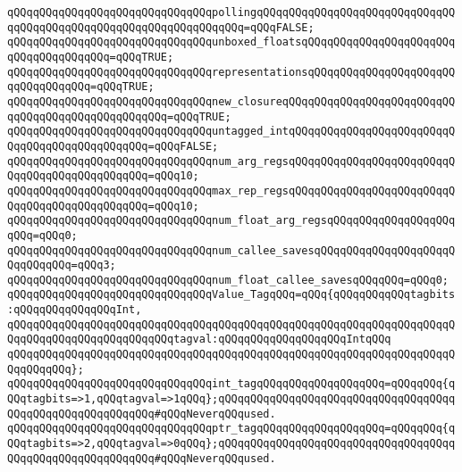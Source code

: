 \verb|qQQqqQQqqQQqqQQqqQQqqQQqqQQqqQQqpollingqQQqqQQqqQQqqQQqqQQqqQQqqQQqqQQqqQQqqQQqqQQqqQQqqQQqqQQqqQQqqQQqqQQq=qQQqFALSE;|\newline
\verb|qQQqqQQqqQQqqQQqqQQqqQQqqQQqqQQqunboxed_floatsqQQqqQQqqQQqqQQqqQQqqQQqqQQqqQQqqQQqqQQq=qQQqTRUE;|\newline
\verb|qQQqqQQqqQQqqQQqqQQqqQQqqQQqqQQqrepresentationsqQQqqQQqqQQqqQQqqQQqqQQqqQQqqQQqqQQq=qQQqTRUE;|\newline
\verb|qQQqqQQqqQQqqQQqqQQqqQQqqQQqqQQqnew_closureqQQqqQQqqQQqqQQqqQQqqQQqqQQqqQQqqQQqqQQqqQQqqQQqqQQq=qQQqTRUE;|\newline
\verb|qQQqqQQqqQQqqQQqqQQqqQQqqQQqqQQquntagged_intqQQqqQQqqQQqqQQqqQQqqQQqqQQqqQQqqQQqqQQqqQQqqQQq=qQQqFALSE;|\newline
\newline
\verb|qQQqqQQqqQQqqQQqqQQqqQQqqQQqqQQqnum_arg_regsqQQqqQQqqQQqqQQqqQQqqQQqqQQqqQQqqQQqqQQqqQQqqQQq=qQQq10;|\newline
\verb|qQQqqQQqqQQqqQQqqQQqqQQqqQQqqQQqmax_rep_regsqQQqqQQqqQQqqQQqqQQqqQQqqQQqqQQqqQQqqQQqqQQqqQQq=qQQq10;|\newline
\verb|qQQqqQQqqQQqqQQqqQQqqQQqqQQqqQQqnum_float_arg_regsqQQqqQQqqQQqqQQqqQQqqQQq=qQQq0;|\newline
\verb|qQQqqQQqqQQqqQQqqQQqqQQqqQQqqQQqnum_callee_savesqQQqqQQqqQQqqQQqqQQqqQQqqQQqqQQq=qQQq3;|\newline
\verb|qQQqqQQqqQQqqQQqqQQqqQQqqQQqqQQqnum_float_callee_savesqQQqqQQq=qQQq0;|\newline
\newline
\verb|qQQqqQQqqQQqqQQqqQQqqQQqqQQqqQQqValue_TagqQQq=qQQq{qQQqqQQqqQQqtagbits:qQQqqQQqqQQqqQQqInt,|\newline
\verb|qQQqqQQqqQQqqQQqqQQqqQQqqQQqqQQqqQQqqQQqqQQqqQQqqQQqqQQqqQQqqQQqqQQqqQQqqQQqqQQqqQQqqQQqqQQqqQQqtagval:qQQqqQQqqQQqqQQqqQQqIntqQQq|\newline
\verb|qQQqqQQqqQQqqQQqqQQqqQQqqQQqqQQqqQQqqQQqqQQqqQQqqQQqqQQqqQQqqQQqqQQqqQQqqQQqqQQq};|\newline
\newline
\verb|qQQqqQQqqQQqqQQqqQQqqQQqqQQqqQQqint_tagqQQqqQQqqQQqqQQqqQQq=qQQqqQQq{qQQqtagbits=>1,qQQqtagval=>1qQQq};qQQqqQQqqQQqqQQqqQQqqQQqqQQqqQQqqQQqqQQqqQQqqQQqqQQqqQQqqQQq#qQQqNeverqQQqused.|\newline
\verb|qQQqqQQqqQQqqQQqqQQqqQQqqQQqqQQqptr_tagqQQqqQQqqQQqqQQqqQQq=qQQqqQQq{qQQqtagbits=>2,qQQqtagval=>0qQQq};qQQqqQQqqQQqqQQqqQQqqQQqqQQqqQQqqQQqqQQqqQQqqQQqqQQqqQQqqQQq#qQQqNeverqQQqused.|\newline
